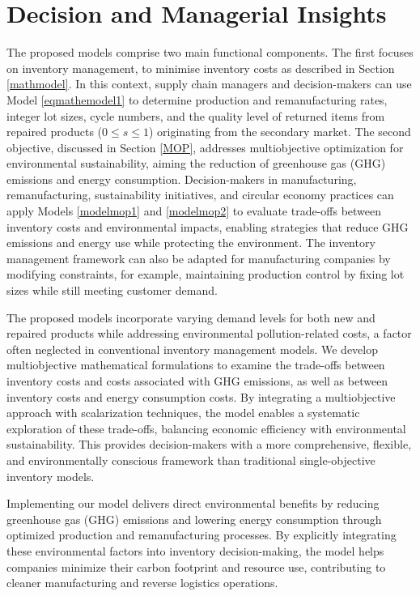 \documentclass[11pt]{article}
\begin{document}
\section{Decision and Managerial Insights} \label{Insight}
\noindent The proposed models comprise two main functional components. The first focuses on inventory management, to minimise inventory costs as described in Section \ref{mathmodel}. In this context, supply chain managers and decision-makers can use Model \eqref{eqmathemodel1} to determine production and remanufacturing rates, integer lot sizes, cycle numbers, and the quality level of returned items from repaired products ($0 \leq s \leq 1$) originating from the secondary market.
The second objective, discussed in Section \ref{MOP}, addresses multiobjective optimization for environmental sustainability, aiming the reduction of greenhouse gas (GHG) emissions and energy consumption. Decision-makers in manufacturing, remanufacturing, sustainability initiatives, and circular economy practices can apply Models \eqref{modelmop1} and \eqref{modelmop2} to evaluate trade-offs between inventory costs and environmental impacts, enabling strategies that reduce GHG emissions and energy use while protecting the environment.
The inventory management framework can also be adapted for manufacturing companies by modifying constraints, for example, maintaining production control by fixing lot sizes while still meeting customer demand.

\noindent The proposed models incorporate varying demand levels for both new and repaired products while addressing environmental pollution-related costs, a factor often neglected in conventional inventory management models. We develop multiobjective mathematical formulations to examine the trade-offs between inventory costs and costs associated with GHG emissions, as well as between inventory costs and energy consumption costs. By integrating a multiobjective approach with scalarization techniques, the model enables a systematic exploration of these trade-offs, balancing economic efficiency with environmental sustainability. This provides decision-makers with a more comprehensive, flexible, and environmentally conscious framework than traditional single-objective inventory models.

\noindent Implementing our model delivers direct environmental benefits by reducing greenhouse gas (GHG) emissions and lowering energy consumption through optimized production and remanufacturing processes. By explicitly integrating these environmental factors into inventory decision-making, the model helps companies minimize their carbon footprint and resource use, contributing to cleaner manufacturing and reverse logistics operations. 
\end{document}
